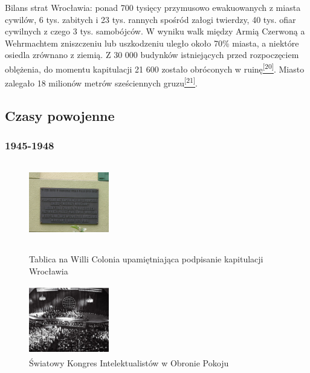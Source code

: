 \documentclass{article}
\begin{document}
Bilans strat Wrocławia: ponad 700 tysięcy przymusowo ewakuowanych z miasta cywilów, 6 tys. zabitych i 23 tys. rannych spośród załogi twierdzy, 40 tys. ofiar cywilnych z czego 3 tys. samobójców. W wyniku walk między Armią Czerwoną a Wehrmachtem zniszczeniu lub uszkodzeniu uległo około 70\% miasta, a niektóre osiedla zrównano z ziemią. Z 30 000 budynków istniejących przed rozpoczęciem oblężenia, do momentu kapitulacji 21 600 zostało obróconych w ruinę\hyperlink{20}{\textsuperscript{[20]}}. Miasto zalegało 18 milionów metrów sześciennych gruzu\hyperlink{21}{\textsuperscript{[21]}}.
\newpage
\subsection{Czasy powojenne}

\subsubsection{1945-1948}
\begin{figure}
\includegraphics[width= 3.5cm, height= 3.5cm]{images/Zdjecie16.JPG}
\caption{Tablica na Willi Colonia upamiętniająca podpisanie kapitulacji Wrocławia}
\vspace{1cm}
\includegraphics[width= 3.5cm, height= 3.0cm]{images/Zdjecie17.png}
\caption{Światowy Kongres Intelektualistów w Obronie Pokoju}
\end{figure}
\end{document}
